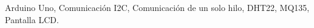 \begin{abstract}
\lipsum[1]
\end{abstract}

\begin{IEEEkeywords}
Arduino Uno, Comunicación I2C, Comunicación de un solo hilo, DHT22, MQ135, Pantalla LCD.
\end{IEEEkeywords}

\IEEEpeerreviewmaketitle
